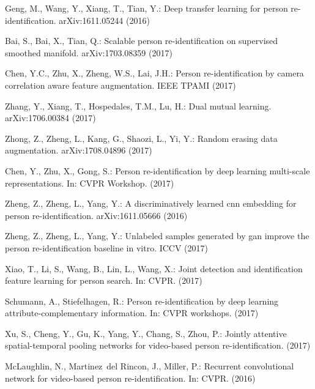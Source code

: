 \documentclass{llncs}
\begin{document}
\begin{thebibliography}{10}
Geng, M., Wang, Y., Xiang, T., Tian, Y.:
\newblock Deep transfer learning for person re-identification.
\newblock arXiv:1611.05244 (2016)

Bai, S., Bai, X., Tian, Q.:
\newblock Scalable person re-identification on supervised smoothed manifold.
\newblock arXiv:1703.08359 (2017)

Chen, Y.C., Zhu, X., Zheng, W.S., Lai, J.H.:
\newblock Person re-identification by camera correlation aware feature
  augmentation.
\newblock IEEE TPAMI (2017)

Zhang, Y., Xiang, T., Hospedales, T.M., Lu, H.:
\newblock Dual mutual learning.
\newblock arXiv:1706.00384 (2017)

Zhong, Z., Zheng, L., Kang, G., Shaozi, L., Yi, Y.:
\newblock Random erasing data augmentation.
\newblock arXiv:1708.04896 (2017)

Chen, Y., Zhu, X., Gong, S.:
\newblock Person re-identification by deep learning multi-scale
  representations.
\newblock In: CVPR Workshop. (2017)

Zheng, Z., Zheng, L., Yang, Y.:
\newblock A discriminatively learned cnn embedding for person
  re-identification.
\newblock arXiv:1611.05666 (2016)

Zheng, Z., Zheng, L., Yang, Y.:
\newblock Unlabeled samples generated by gan improve the person
  re-identification baseline in vitro.
\newblock ICCV (2017)

Xiao, T., Li, S., Wang, B., Lin, L., Wang, X.:
\newblock Joint detection and identification feature learning for person
  search.
\newblock In: CVPR. (2017)

Schumann, A., Stiefelhagen, R.:
\newblock Person re-identification by deep learning attribute-complementary
  information.
\newblock In: CVPR workshops. (2017)

Xu, S., Cheng, Y., Gu, K., Yang, Y., Chang, S., Zhou, P.:
\newblock Jointly attentive spatial-temporal pooling networks for video-based
  person re-identification.
\newblock (2017)

McLaughlin, N., Martinez~del Rincon, J., Miller, P.:
\newblock Recurrent convolutional network for video-based person
  re-identification.
\newblock In: CVPR. (2016)


\end{thebibliography}
\end{document}
